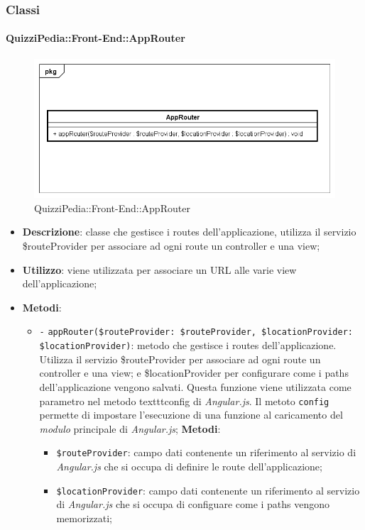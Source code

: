 \subsubsection{Classi}
	\paragraph{QuizziPedia::Front-End::AppRouter}
	
	\label{QuizziPedia::Front-End::AppRouter}
	
	\begin{figure}[ht]
		\centering
		\includegraphics[scale=0.5,keepaspectratio]{UML/Classi/Front-End/QuizziPedia_Front-end_AppRouter.png}
		\caption{QuizziPedia::Front-End::AppRouter}
	\end{figure} \FloatBarrier
	
	\begin{itemize}
		\item \textbf{Descrizione}: classe che gestisce i routes dell’applicazione, utilizza il servizio \$routeProvider per associare ad ogni route un controller e una view;
		\item \textbf{Utilizzo}: viene utilizzata per associare un URL alle varie view dell’applicazione;
		\item \textbf{Metodi}: 
		\begin{itemize}
			\item \texttt{-} \texttt{appRouter(\$routeProvider: \$routeProvider, \$locationProvider: \$locationProvider)}: metodo che gestisce i routes dell’applicazione. Utilizza il servizio \$routeProvider per associare ad ogni route un controller e una view; e \$locationProvider per configurare come i paths dell'applicazione vengono salvati. Questa funzione viene utilizzata come parametro nel metodo texttt{config} di \textit{Angular.js}. Il metoto \texttt{config} permette di impostare l'esecuzione di una funzione al caricamento del \textit{modulo} principale di \textit{Angular.js};
			\textbf{Metodi}:
			\begin{itemize}
				\item \texttt{\$routeProvider}: campo dati contenente un riferimento al servizio di \textit{Angular.js} che si occupa di definire le route dell’applicazione;
				\item \texttt{\$locationProvider}: campo dati contenente un riferimento al servizio di \textit{Angular.js} che si occupa di configuare come i paths vengono memorizzati;
			\end{itemize}
		\end{itemize}
	\end{itemize}
	
